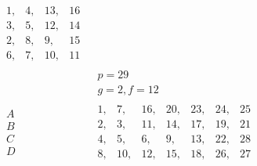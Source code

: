 \documentclass[twoside,12pt, showframe]{memoir}
\begin{document}
\[\begin{aligned}
\begin{array}{|rrrr} 
1,& 4,&13,& 16 \\ 
3,& 5,&12,&14 \\
2,& 8,& 9,&15 \\ 
6,& 7,&10,&11 
\end{array} \\
& \begin{array}{c} p=29 \\  g=2, f=12 \end{array} \\
\begin{array}{l} A \\ B \\ C \\D \end{array} & 
\begin{array}{|rrrrrrr} 1,&7,&16,&20,&23,&24,&25\\ 
2,& 3,&11,&14,&17,&19,&21 \\ 
4,& 5,&6,&9,&13,&22,&28 \\ 
8,& 10,& 12,&15,&18,& 26,&27
\end{array} \\
\end{aligned}\]\clearpage\noindent%
\end{document}

